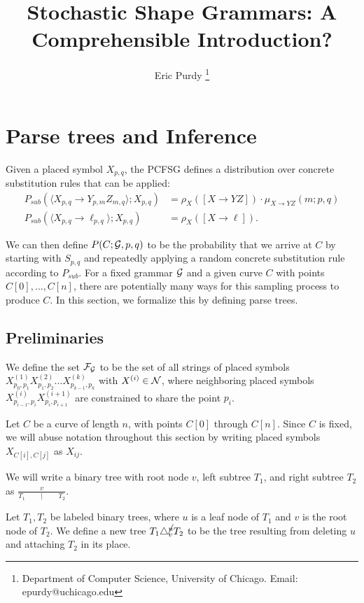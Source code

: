 \documentclass{article}
\title{Stochastic Shape Grammars: A Comprehensible Introduction?}
\author{Eric Purdy \footnote{Department of Computer Science, University of Chicago. Email: epurdy@uchicago.edu}}
\begin{document}
\maketitle

\section{Parse trees and Inference}

Given a placed symbol $X_{p,q}$, the PCFSG defines a distribution over
concrete substitution rules that can be applied:
\begin{align*}
  P_{sub}( \langle X_{p,q} \to Y_{p,m} Z_{m,q}\rangle ; X_{p,q})
  &= \rho_X([X\to YZ]) \cdot \mu_{X\to YZ}(m; p,q)\\
  P_{sub}( \langle X_{p,q} \to \ell_{p,q} \rangle ; X_{p,q}) 
  &= \rho_X([X\to \ell]).
\end{align*}

We can then define $P(C; {\mathcal G}, p,q)$ to be the probability that we
arrive at $C$ by starting with $S_{p,q}$ and repeatedly applying a
random concrete substitution rule according to $P_{sub}$. For a fixed
grammar ${\mathcal G}$ and a given curve $C$ with points $C[0], \dots, C[n]$,
there are potentially many ways for this sampling process to produce
$C$. In this section, we formalize this by defining parse trees.

\subsection{Preliminaries}

\begin{defn}
We define the set ${\mathcal F}_{{\mathcal G}}$ to be the set of all strings of placed
symbols $X^{(1)}_{p_0,p_1} X^{(2)}_{p_1,p_2} \dots X^{(k)}_{p_{k-1},
  p_k}$ with $X^{(i)} \in {\mathcal N}$, where neighboring placed symbols
$X^{(i)}_{p_{i-1},p_i} X^{(i+1)}_{p_i,p_{i+1}}$ are constrained to
share the point $p_i$.
\end{defn}

Let $C$ be a curve of length $n$, with points $C[0]$ through
$C[n]$. Since $C$ is fixed, we will abuse notation throughout this
section by writing placed symbols $X_{C[i],C[j]}$ as $X_{ij}$.

We will write a binary tree with root node $v$, left subtree $T_1$,
and right subtree $T_2$ as $\frac{v}{T_1\qquad \mid \qquad T_2}.$

\begin{defn}
  Let $T_1, T_2$ be labeled binary trees, where $u$ is a leaf node of
  $T_1$ and $v$ is the root node of $T_2$. We define a new tree $T_1
  \triangle^{\cancel{u}}_v T_2$ to be the tree resulting from deleting
  $u$ and attaching $T_2$ in its place.
\end{defn}
\end{document}
